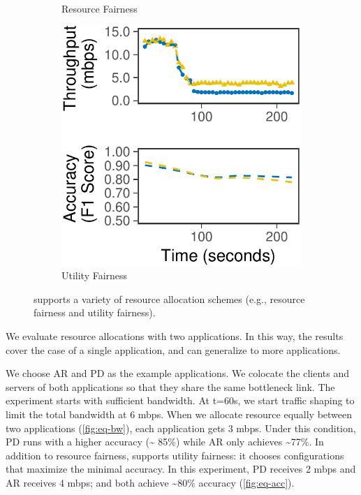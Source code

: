 \begin{figure}
\begin{subfigure}[t]{0.45\columnwidth}
    \caption{Resource Fairness}
    \label{fig:eq-bw}
  \end{subfigure}
  \hfill
  \begin{subfigure}[t]{0.45\columnwidth}
    \centering
    \includegraphics[width=\textwidth]{figures/multitask-right.pdf}
    \caption{Utility Fairness}
    \label{fig:eq-acc}
  \end{subfigure}
  \caption{\sysname{} supports a variety of resource allocation schemes (e.g.,
    resource fairness and utility fairness).}
  \label{fig:multitask}
\end{figure}

We evaluate resource allocations with two applications. In this way, the results
cover the case of a single application, and can generalize to more applications.

We choose AR and PD as the example applications.  We colocate the clients and
servers of both applications so that they share the same bottleneck link. The
experiment starts with sufficient bandwidth. At t=60s, we start traffic shaping
to limit the total bandwidth at 6 mbps. When we allocate resource equally
between two applications (\autoref{fig:eq-bw}), each application gets 3
mbps. Under this condition, PD runs with a higher accuracy (\textasciitilde
85\%) while AR only achieves \textasciitilde 77\%. In addition to resource
fairness, \sysname{} supports utility fairness: it chooses configurations that
maximize the minimal accuracy. In this experiment, PD receives 2 mbps and AR
receives 4 mbps; and both achieve \textasciitilde 80\% accuracy
(\autoref{fig:eq-acc}).


